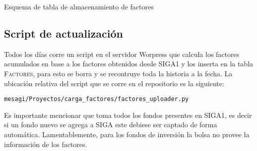 \documentclass{article}
\begin{document}
\begin{table}[h]
{\scriptsize
{}}
\caption{Esquema de tabla de almacenamiento de factores}
\label{bmk-sch}
\end{table}



\subsection{Script de actualización}

Todos los días corre un script en el servidor Worpress que calcula los factores acumulados en base a los factores obtenidos desde SIGA1 y los inserta en la tabla \textsc{Factores}, para esto se borra y se recontruye toda la historia a la fecha. La ubicación relativa del script que se corre en el repositorio es la siguiente:
\begin{center}
\texttt{mesagi/Proyectos/carga\_factores/factores\_uploader.py}
\end{center}

Es importante mencionar que toma todos los fondos presentes en SIGA1, es decir si un fondo nuevo se agrega a SIGA este debiese ser captado de forma automática. Lamentablemente, para los fondos de inversión la bolsa no provee la información de los factores.
\end{document}
